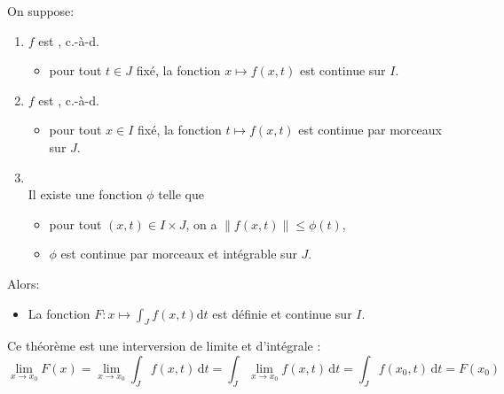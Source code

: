 \documentclass{book}
\begin{document}
\begin{Theoreme}
On suppose:
\begin{enumerate}
\item
  $f$ est , c.-à-d.
  \begin{itemize}
  \item
    pour tout $t\in J$ fixé, la fonction $x \mapsto f(x,t)$ est continue sur $I$.
  \end{itemize}
\item
  $f$ est , c.-à-d.
  \begin{itemize}
  \item
    pour tout $x\in I$ fixé, la fonction $t \mapsto f(x,t)$ est continue par morceaux sur $J$.
  \end{itemize}
\item
  \\
  Il existe une fonction $\phi$ telle que
  \begin{itemize}
  \item
    pour tout $(x,t)\in I\times J$, on a $\|f(x,t)\|\leq\phi (t)$,
  \item
    $\phi $ est continue par morceaux et intégrable sur $J$.
  \end{itemize}
\end{enumerate}
Alors:
\begin{itemize}
\item
  La fonction $F \colon x \mapsto \int_J f(x,t) \mathrm dt$ est définie et continue sur $I$.
\end{itemize}
\end{Theoreme}
\begin{Remarque}
Ce théorème est une interversion de limite et d'intégrale :
$$\lim_{x\to x_0}F(x)=\lim_{x\to x_0}\int_J f(x,t)\, \mathrm dt=\int_J \lim_{x\to x_0} f(x,t)\, \mathrm dt=\int_J f(x_0,t)\, \mathrm dt=F(x_0)$$
\end{Remarque}
\end{document}
